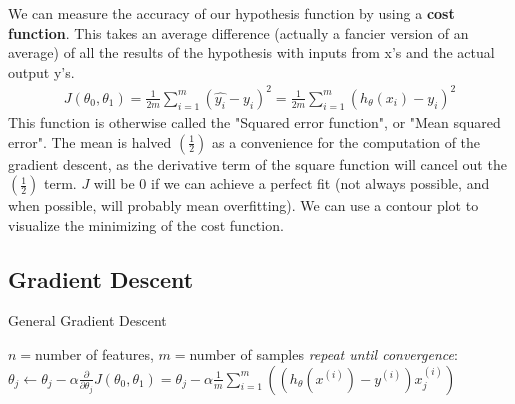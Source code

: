 \documentclass{article}
\begin{document}
            We can measure the accuracy of our hypothesis function by using a \textbf{cost function}. This takes an average difference (actually a fancier version of an average)
            of all the results of the hypothesis with inputs from x's and the actual output y's.
            \begin{align*}
               J(\theta_{0},\theta_{1}) = \frac{1}{2m}\sum_{i=1}^{m}(\hat{y_i} - y_i)^2 = \frac{1}{2m}\sum_{i=1}^{m}(h_{\theta}(x_i)- y_i)^2
            \end{align*}
            This function is otherwise called the "Squared error function", or "Mean squared error". The mean is halved $\left(\frac{1}{2}\right)$
            as a convenience for the computation of the gradient descent, as the derivative term of the square function will cancel out the $\left(\frac{1}{2}\right)$ 
            term. $J$ will be 0 if we can achieve a perfect fit (not always possible, and when possible, will probably mean overfitting). We can use a contour plot to visualize the minimizing of the cost function.
            \vspace{12pt}
            \begin{center}
            \end{center}
            
        \subsection{Gradient Descent}

            \begin{algorithm}
                \caption{General Gradient Descent}
                \begin{algorithmic}
                        \STATE $n = $number of features, $m = $number of samples
                        \STATE \emph{repeat until convergence}:
                        \STATE \hspace{12pt}$\theta_j \gets \theta_j - \alpha\frac{\partial}{\partial\theta_j}J(\theta_{0},\theta_{1}) =
                                            \theta_j - \alpha\frac{1}{m}\sum_{i=1}^{m}((h_{\theta}(x^{(i)})-y^{(i)})x_j^{(i)})$
                    \ENDFOR
                \end{algorithmic}
            \end{algorithm}
            
\end{document}
